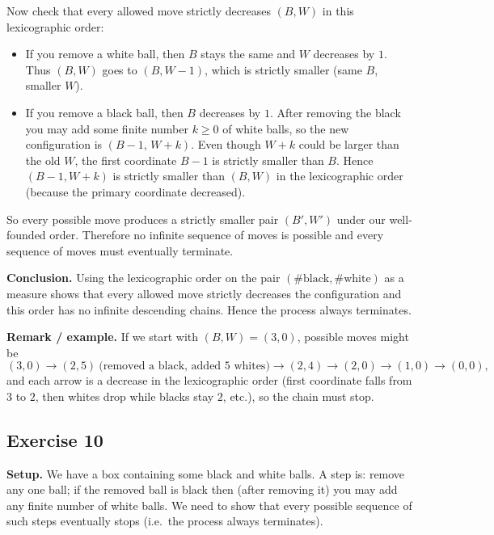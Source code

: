 \documentclass[12pt]{article}
\begin{document}
\begin{itemize}
Now check that every allowed move strictly decreases \((B,W)\) in this lexicographic order:

\begin{itemize}
  \item If you remove a white ball, then \(B\) stays the same and \(W\) decreases by \(1\). Thus \((B,W)\) goes to \((B,W-1)\), which is strictly smaller (same \(B\), smaller \(W\)).
  \item If you remove a black ball, then \(B\) decreases by \(1\). After removing the black you may add some finite number \(k\ge 0\) of white balls, so the new configuration is \((B-1,\,W+k)\). Even though \(W+k\) could be larger than the old \(W\), the first coordinate \(B-1\) is strictly smaller than \(B\). Hence \((B-1,W+k)\) is strictly smaller than \((B,W)\) in the lexicographic order (because the primary coordinate decreased).
\end{itemize}

So every possible move produces a strictly smaller pair \((B',W')\) under our well-founded order. Therefore no infinite sequence of moves is possible and every sequence of moves must eventually terminate.

\bigskip

\textbf{Conclusion.}  
Using the lexicographic order on the pair \((\#\text{black},\#\text{white})\) as a measure shows that every allowed move strictly decreases the configuration and this order has no infinite descending chains. Hence the process always terminates.

\bigskip

\textbf{Remark / example.}  
If we start with \((B,W)=(3,0)\), possible moves might be
\[
(3,0)\to(2,5)\ \text{(removed a black, added 5 whites)}\to(2,4)\to(2,0)\to(1,0)\to(0,0),
\]
and each arrow is a decrease in the lexicographic order (first coordinate falls from \(3\) to \(2\), then whites drop while blacks stay \(2\), etc.), so the chain must stop.
\subsection*{Exercise 10}

\textbf{Setup.}  
We have a box containing some black and white balls. A step is: remove any one ball; if the removed ball is black then (after removing it) you may add any finite number of white balls. We need to show that every possible sequence of such steps eventually stops (i.e.\ the process always terminates).

\bigskip


\end{itemize}
\end{document}
